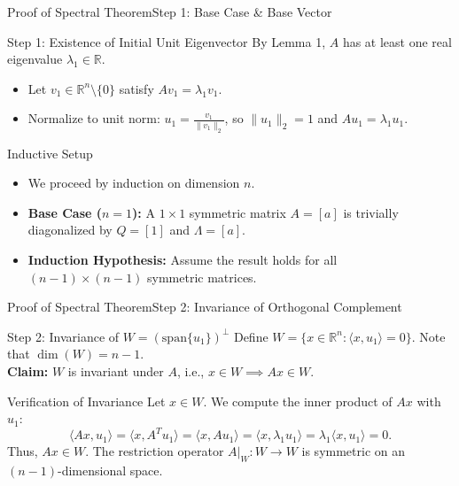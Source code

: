 \documentclass[10pt, aspectratio=169]{beamer}
\begin{document}
\begin{frame}{Proof of Spectral Theorem}{Step 1: Base Case \& Base Vector}
  \begin{proofstep}{Step 1: Existence of Initial Unit Eigenvector}
    \small
    By Lemma 1, $A$ has at least one real eigenvalue $\lambda_1 \in \mathbb{R}$.
    \begin{itemize}
      \item Let $v_1 \in \mathbb{R}^n \setminus \{0\}$ satisfy $A v_1 = \lambda_1 v_1$.
      \item Normalize to unit norm: $u_1 = \frac{v_1}{\|v_1\|_2}$, so $\|u_1\|_2 = 1$ and $A u_1 = \lambda_1 u_1$.
    \end{itemize}
  \end{proofstep}

  \vspace*{0.1cm}

  \begin{conceptbox}{Inductive Setup}
    \small
    \begin{itemize}
      \item We proceed by induction on dimension $n$.
      \item \textbf{Base Case ($n=1$):} A $1 \times 1$ symmetric matrix $A = [a]$ is trivially diagonalized by $Q = [1]$ and $\Lambda = [a]$.
      \item \textbf{Induction Hypothesis:} Assume the result holds for all $(n-1) \times (n-1)$ symmetric matrices.
    \end{itemize}
  \end{conceptbox}
\end{frame}

\begin{frame}{Proof of Spectral Theorem}{Step 2: Invariance of Orthogonal Complement}
  \begin{proofstep}{Step 2: Invariance of $W = (\mathrm{span}\{u_1\})^\perp$}
    \small
    Define $W = \{x \in \mathbb{R}^n : \langle x, u_1 \rangle = 0\}$. Note that $\dim(W) = n - 1$.
    \\[2pt]
    \textbf{Claim:} $W$ is invariant under $A$, i.e., $x \in W \implies A x \in W$.
  \end{proofstep}

  \vspace*{0.1cm}

  \begin{conceptbox}{Verification of Invariance}
    \small
    Let $x \in W$. We compute the inner product of $Ax$ with $u_1$:
    \[
      \langle Ax, u_1 \rangle = \langle x, A^T u_1 \rangle = \langle x, A u_1 \rangle = \langle x, \lambda_1 u_1 \rangle = \lambda_1 \langle x, u_1 \rangle = 0.
    \]
    Thus, $Ax \in W$. The restriction operator $A|_W : W \to W$ is symmetric on an $(n-1)$-dimensional space.
  \end{conceptbox}
\end{frame}
\end{document}
